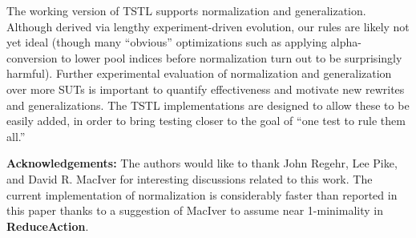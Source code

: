 The working version of  TSTL \cite{tstl} supports
normalization and generalization.  Although derived via lengthy experiment-driven
evolution, our rules are likely not yet ideal (though many ``obvious''
optimizations such as applying alpha-conversion to lower pool indices
before normalization turn out to be surprisingly harmful).   Further experimental
evaluation of normalization and generalization over more SUTs is
important to quantify effectiveness and motivate new rewrites and
generalizations.  The TSTL implementations are designed to allow these
to be easily added, in order to bring testing closer to the
goal of ``one test to rule them all.''


{ {\bf Acknowledgements:} The authors would like to thank
  John Regehr, Lee Pike, and David R. MacIver for interesting
  discussions related to this work.  The current implementation of
  normalization is considerably faster than reported in
  this paper thanks to a suggestion of MacIver to assume near
  1-minimality in {\bf ReduceAction}.
}
